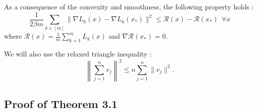 \documentclass{article} %
\begin{document}
As a consequence of the convexity and smoothness, the following property holds \citep[Theorem 2.1.5]{Nesterove2018}:
\begin{equation}\label{convex1}
    \frac{1}{2\beta m} \sum_{k\in [m]} \lVert \nabla L_k(x)-\nabla L_k(x_*) \rVert^2 \le \mathcal{R}(x)-\mathcal{R}(x_*) \ \   \forall x
\end{equation}
where $\mathcal{R}(x)=\frac{1}{m}\sum_{k=1}^m L_k(x)$ and $\nabla \mathcal{R}(x_*)=0$.

We will also use the relaxed triangle inequality \citep[Lemma 3]{Karimireddy2020scaffold}:
\begin{equation}\label{triangle}
    \left \lVert\sum_{j=1}^n v_j \right\rVert^2 \le n\sum_{j=1}^n \lVert v_j \rVert^2.
\end{equation}
\subsection{Proof of Theorem 3.1} \label{append_theorem}
\end{document}
